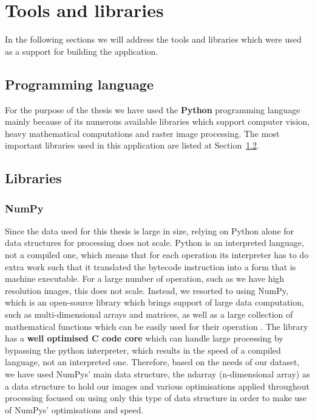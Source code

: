\documentclass[12pt, a4paper]{report}
\begin{document}
		
	\section{Tools and libraries}
	\label{seq:extras}
	
	In the following sections we will address the tools and libraries which were used as a support for building the application.
	
	\subsection{Programming language}
	\label{seq:programminglang}
	
	\par For the purpose of the thesis we have used the \textbf{Python} programming language mainly because of its numerous available libraries which support computer vision, heavy mathematical computations and raster image processing. The most important libraries used in this application are listed at Section~\ref{seq:libraries}.
	
	\subsection{Libraries}
	\label{seq:libraries}
	
	\subsubsection{NumPy}
	
	\par Since the data used for this thesis is large in size, relying on Python alone for data structures for processing does not scale. Python is an interpreted language, not a compiled one, which means that for each operation its interpreter has to do extra work such that it translated the bytecode instruction into a form that is machine executable. For a large number of operation, such as we have high resolution images, this does not scale. Instead, we resorted to using NumPy, which is an open-source library which brings support of large data computation, such as multi-dimensional arrays and matrices, as well as a large collection of mathematical functions which can be easily used for their operation \cite{HARRIS2020}. The library has a \textbf{well optimised C code core} which can handle large processing by bypassing the python interpreter, which results in the speed of a compiled language, not an interpreted one. Therefore, based on the needs of our dataset, we have used NumPys' main data structure, the ndarray (n-dimensional array) as a data structure to hold our images and various optimisations applied throughout processing focused on using only this type of data structure in order to make use of NumPys' optimisations and speed.
	
\end{document}
